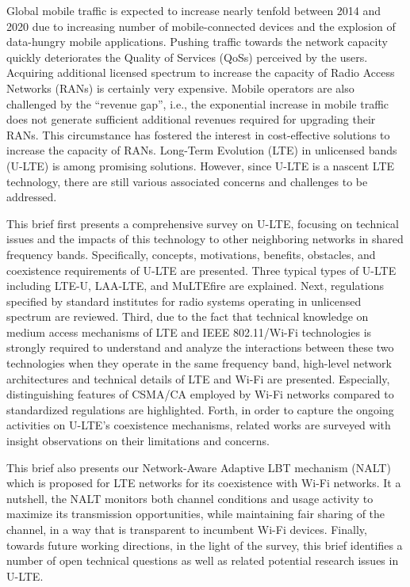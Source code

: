 %
%

\preface

Global mobile traffic is expected to increase nearly tenfold between 2014 and 2020 due to increasing number of mobile-connected devices and the explosion of data-hungry mobile applications. Pushing traffic towards the network capacity quickly deteriorates the Quality of Services (QoSs) perceived by the users. Acquiring additional licensed spectrum to increase the capacity of Radio Access Networks (RANs) is certainly very expensive. Mobile operators are also challenged by the “revenue gap”, i.e., the exponential increase in mobile traffic does not generate sufficient additional revenues required for upgrading their RANs. This circumstance has fostered the interest in cost-effective solutions to increase the capacity of RANs. Long-Term Evolution (LTE) in unlicensed bands (U-LTE) is among promising solutions. However, since U-LTE is a nascent LTE technology, there are still various associated concerns and challenges to be addressed.

This brief first presents a comprehensive survey on U-LTE, focusing on technical issues and the impacts of this technology to other neighboring networks in shared frequency bands. Specifically, concepts, motivations, benefits, obstacles, and coexistence requirements of U-LTE are presented. Three typical types of U-LTE including LTE-U, LAA-LTE, and MuLTEfire are explained. Next, regulations specified by standard institutes for radio systems operating in unlicensed spectrum are reviewed. Third, due to the fact that technical knowledge on medium access mechanisms of LTE and IEEE 802.11/Wi-Fi technologies is strongly required to understand and analyze the interactions between these two technologies when they operate in the same frequency band, high-level network architectures and technical details of LTE and Wi-Fi are presented. Especially, distinguishing features of CSMA/CA employed by Wi-Fi networks compared to standardized regulations are highlighted. Forth, in order to capture the ongoing activities on U-LTE’s coexistence mechanisms, related works are surveyed with insight observations on their limitations and concerns. 

This brief also presents our Network-Aware Adaptive LBT mechanism (NALT) which is proposed for LTE networks for its coexistence with Wi-Fi networks. It a nutshell, the NALT monitors both channel conditions and usage activity to maximize its transmission opportunities, while maintaining fair sharing of the channel, in a way that is transparent to incumbent Wi-Fi devices. Finally, towards future working directions, in the light of the survey, this brief identifies a number of open technical questions as well as related potential research issues in U-LTE.

